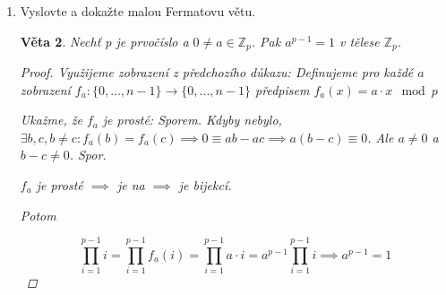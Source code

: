 \documentclass[10pt,a4paper]{article}
\theoremstyle{plain}
\newtheorem{veta}{Věta}
\begin{document}
\begin{enumerate}
\begin{veta}
\begin{proof}
\begin{enumerate}[label=(\alph*)]
\begin{itemize}
Zvolme libovolnou hranu $e$, BÚNO $e = (v_1, v_2)$.
Nechť $A = L_{G}^{1,1}$, $B = L_{G \setminus e}^{1,1}$, $C = L_{G \circ e}^{1,1}$



$A$ a $B$ jsou shodné až na $a_{1,1} - 1 = b_{1,1}$. První sloupec $A$ vyjádříme jako součet prvního sloupce $B$ a elementárního vektoru $e^1$

\[\det(A) = \det(B) + \det\left(\ \begin{array}{|c|c|}
\hline 1 & * \\  \hline  0 & C \\ \hline
\end{array} \ \right) = \det(B) + \det(C)\]

Počet koster můžeme vyjádřit rekurentním vztahem
\[ \kappa(G) = \kappa(G \setminus e) + \kappa(G \circ e) \overset{IP}{=} \det(B) + \det(C) = det(A) \]

\end{itemize}
\end{enumerate}
\end{proof}
\end{veta}

\item Vyslovte a dokažte malou Fermatovu větu.


\begin{veta}

Nechť p je prvočíslo a $0 \neq a \in \mathbb{Z}_p$. Pak $a^{p-1} = 1$ v tělese $\mathbb{Z}_p$.

\begin{proof}
Využijeme zobrazení z předchozího důkazu: 
Definujeme pro každé $a$ zobrazení $f_a: \{0, ..., n-1 \} \to \{0, ..., n-1 \}$ předpisem $f_a(x) = a \cdot x \mod p$

Ukažme, že $f_a$ je prosté: Sporem. Kdyby nebylo, $\exists b,c, b \neq c: f_a(b) = f_a(c) \implies 0 \equiv ab-ac \implies a (b-c) \equiv 0$. Ale $a \neq 0$ a $b-c \neq 0$. Spor.

$f_a$ je prosté $\implies$ je na $\implies$ je bijekcí.

Potom 

\begin{equation*}
\prod_{i=1}^{p-1} i = \prod_{i=1}^{p-1} f_a(i) = \prod_{i=1}^{p-1} a\cdot i = a^{p-1} \prod_{i=1}^{p-1} i  \implies a^{p-1} = 1
\end{equation*}
\end{proof}
\end{veta}


\end{enumerate}
\end{document}

